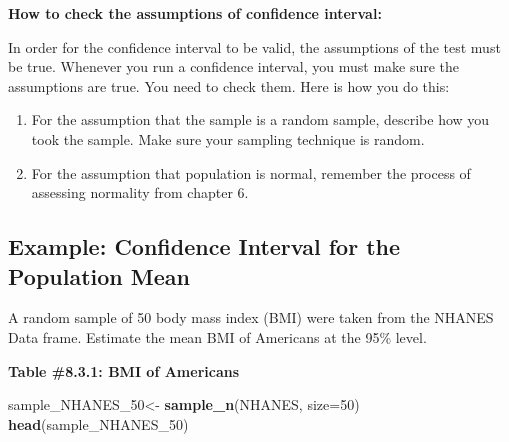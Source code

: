 \documentclass[
]{book}
\newenvironment{Shaded}{\begin{snugshade}}{\end{snugshade}}
\newcommand{\DataTypeTok}[1]{\textcolor[rgb]{0.13,0.29,0.53}{#1}}
\newcommand{\DecValTok}[1]{\textcolor[rgb]{0.00,0.00,0.81}{#1}}
\newcommand{\KeywordTok}[1]{\textcolor[rgb]{0.13,0.29,0.53}{\textbf{#1}}}
\newcommand{\NormalTok}[1]{#1}
\newcommand{\StringTok}[1]{\textcolor[rgb]{0.31,0.60,0.02}{#1}}
\begin{document}
\textbf{How to check the assumptions of confidence interval:}

In order for the confidence interval to be valid, the assumptions of the test must be true. Whenever you run a confidence interval, you must make sure the assumptions are true. You need to check them. Here is how you do this:

\begin{enumerate}
\def\labelenumi{\arabic{enumi}.}
\item
  For the assumption that the sample is a random sample, describe how you took the sample. Make sure your sampling technique is random.
\item
  For the assumption that population is normal, remember the process of assessing normality from chapter 6.
\end{enumerate}

\hypertarget{example-confidence-interval-for-the-population-mean}{%
\subsection{Example: Confidence Interval for the Population Mean}\label{example-confidence-interval-for-the-population-mean}}

A random sample of 50 body mass index (BMI) were taken from the NHANES Data frame. Estimate the mean BMI of Americans at the 95\% level.

\textbf{Table \#8.3.1: BMI of Americans}

\begin{Shaded}
\begin{Highlighting}[]
\NormalTok{sample_NHANES_}\DecValTok{50}\NormalTok{<-}
\StringTok{  }\KeywordTok{sample_n}\NormalTok{(NHANES, }\DataTypeTok{size=}\DecValTok{50}\NormalTok{)}
\KeywordTok{head}\NormalTok{(sample_NHANES_}\DecValTok{50}\NormalTok{)}
\end{Highlighting}
\end{Shaded}
\end{document}
